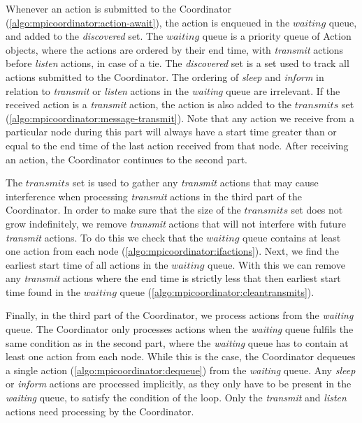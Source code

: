 Whenever an action is submitted to the Coordinator (\autoref{algo:mpicoordinator:action-await}), the action is
enqueued in the $\mathit{waiting}$ queue, and added to the \textit{discovered} set. The $\mathit{waiting}$
queue is a priority queue of Action objects, where the actions are ordered by their end time, with
\textit{transmit} actions before \textit{listen} actions, in case of a tie. The \textit{discovered} set is
a set used to track all actions submitted to the Coordinator. The ordering of \textit{sleep} and
\textit{inform} in relation to \textit{transmit} or \textit{listen} actions in the \textit{waiting} queue are
irrelevant. If the received action is a \textit{transmit} action, the action is also added to the
$\mathit{transmits}$ set (\autoref{algo:mpicoordinator:message-transmit}). Note that any action we receive
from a particular node during this part will always have a start time greater than or equal to the end time of
the last action received from that node. After receiving an action, the Coordinator continues to the second
part. \medbreak

The $\mathit{transmits}$ set is used to gather any \textit{transmit} actions that may cause interference when
processing \textit{transmit} actions in the third part of the Coordinator. In order to make sure that the size
of the $\mathit{transmits}$ set does not grow indefinitely, we remove \textit{transmit} actions that will not
interfere with future \textit{transmit} actions. To do this we check that the $\mathit{waiting}$ queue
contains at least one action from each node (\autoref{algo:mpicoordinator:ifactions}). Next, we find the
earliest start time of all actions in the $\mathit{waiting}$ queue. With this we can remove any
\textit{transmit} actions where the end time is strictly less that then earliest start time found in the
$\mathit{waiting}$ queue (\autoref{algo:mpicoordinator:cleantransmits}). \medbreak

Finally, in the third part of the Coordinator, we process actions from the \textit{waiting} queue. The
Coordinator only processes actions when the \textit{waiting} queue fulfils the same condition as in the second
part, where the \textit{waiting} queue has to contain at least one action from each node. While this is the
case, the Coordinator dequeues a single action (\autoref{algo:mpicoordinator:dequeue}) from the
\textit{waiting} queue. Any \textit{sleep} or \textit{inform} actions are processed implicitly, as they only
have to be present in the \textit{waiting} queue, to satisfy the condition of the loop. Only the
\textit{transmit} and \textit{listen} actions need processing by the Coordinator. \medbreak 

